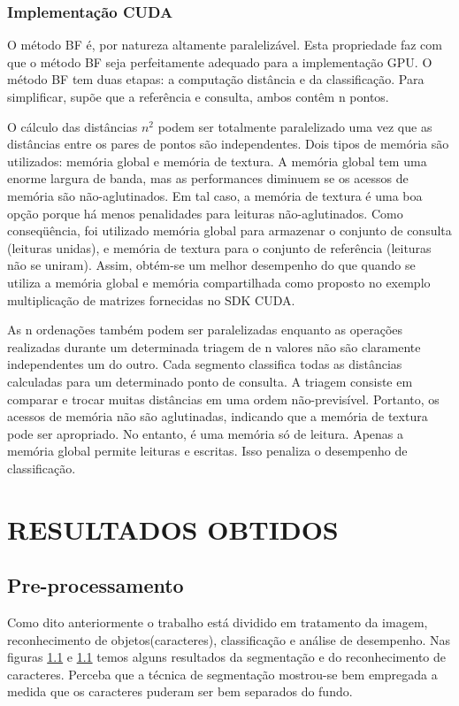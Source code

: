 \documentclass[letterpaper, 10 pt, conference]{ieeeconf}  %
\begin{document}
\subsubsection{Implementação CUDA}

O método BF é, por natureza altamente paralelizável. Esta propriedade faz com que o método BF seja perfeitamente adequado para a implementação GPU. O método BF tem duas etapas: a computação distância e da classificação. Para simplificar, supõe que a referência e consulta, ambos contêm n pontos. 

O cálculo das distâncias $n^2$ podem ser totalmente paralelizado uma vez que as distâncias entre os pares de pontos são independentes. Dois tipos de memória são utilizados: memória global e memória de textura. A memória global tem uma enorme largura de banda, mas as performances diminuem se os acessos de memória são não-aglutinados. Em tal caso, a memória de textura é uma boa opção porque há menos penalidades para leituras não-aglutinados. Como conseqüência, foi utilizado memória global para armazenar o conjunto de consulta (leituras unidas), e memória de textura para o conjunto de referência (leituras não se uniram). Assim, obtém-se um melhor desempenho do que quando se utiliza a memória global e memória compartilhada como proposto no exemplo multiplicação de matrizes fornecidas no SDK CUDA. 

As n ordenações também podem ser paralelizadas enquanto as operações realizadas durante um determinada triagem de n valores não são claramente independentes um do outro. Cada segmento classifica todas as distâncias calculadas para um determinado ponto de consulta. A triagem consiste em comparar e trocar muitas distâncias em uma ordem não-previsível. Portanto, os acessos de memória não são aglutinadas, indicando que a memória de textura pode ser apropriado. No entanto, é uma memória só de leitura. Apenas a memória global permite leituras e escritas. Isso penaliza o desempenho de classificação.

\section{RESULTADOS OBTIDOS}
\subsection{Pre-processamento}
Como dito anteriormente o trabalho está dividido em tratamento da imagem,
reconhecimento de objetos(caracteres), classificação e análise de desempenho.
Nas figuras \ref{} e \ref{} temos alguns resultados da segmentação e do
reconhecimento de caracteres. Perceba que a técnica de segmentação mostrou-se
bem empregada a medida que os caracteres puderam ser bem separados do fundo.
\end{document}
